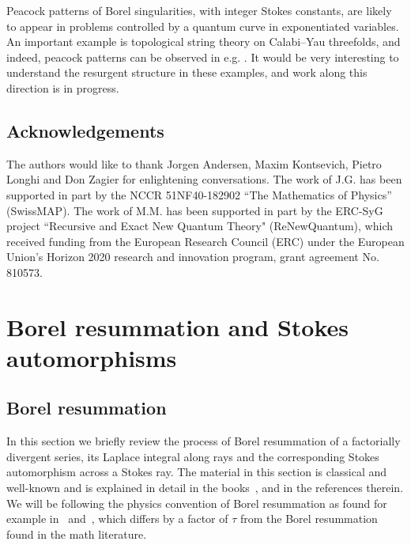 \documentclass[12pt,reqno]{amsart}
\theoremstyle{definition}
\begin{document}
Peacock patterns of Borel singularities, with integer Stokes constants, are likely to appear in 
problems controlled by a quantum curve in exponentiated variables. An important example is 
topological string theory on Calabi--Yau threefolds, and indeed, peacock patterns can be observed in e.g. \cite{cms}. It would 
be very interesting to understand the resurgent structure in these examples, and work along this direction is in progress. 


\subsection*{Acknowledgements} 
The authors would like to thank Jorgen Andersen, Maxim Kontsevich,
Pietro Longhi and Don Zagier for enlightening conversations. The work
of J.G.  has been supported in part by the NCCR 51NF40-182902 ``The
Mathematics of Physics'' (SwissMAP). The work of M.M. has been
supported in part by the ERC-SyG project ``Recursive and Exact New
Quantum Theory" (ReNewQuantum), which received funding from the
European Research Council (ERC) under the European Union's Horizon
2020 research and innovation program, grant agreement No. 810573.


\section{Borel resummation and Stokes automorphisms}
\label{sec.borel}

\subsection{Borel resummation}
\label{sub.borel}


In this section we briefly review the process of Borel resummation of
a factorially divergent series, its Laplace integral along rays and
the corresponding Stokes automorphism across a Stokes ray. The
material in this section is classical and well-known and is explained
in detail in the books~\cite{Costin:asymptotics,Miller:applied,msauzin},
and in the references therein. We will be following the physics convention
of Borel resummation as found for example in~\cite[Sec. 3.2]{mmbook}
and~\cite[Sec.42.5]{Zinn-Zustin:QFT}, which differs by a factor of
$\tau$ from the Borel resummation found in the math literature.
\end{document}
